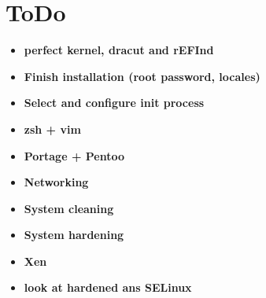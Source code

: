 \documentclass[10pt, a4paper, onecolumn, oneside, titlepage, openany]{book}
\begin{document}
\chapter{ToDo}
\begin{itemize}
    \item \textbf{perfect kernel, dracut and rEFInd}
    \item \textbf{Finish installation (root password, locales)}
    \item \textbf{Select and configure init process}
    \item \textbf{zsh + vim}
    \item \textbf{Portage + Pentoo}
    \item \textbf{Networking}
    \item \textbf{System cleaning}
    \item \textbf{System hardening}
    \item \textbf{Xen}
    \item \textbf{look at hardened ans SELinux}
\end{itemize}
\end{document}
